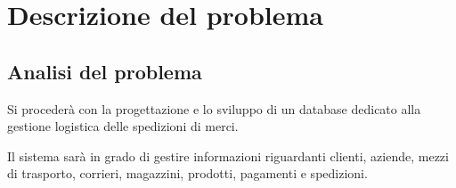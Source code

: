 \section{Descrizione del problema}

\subsection{Analisi del problema}

Si procederà con la progettazione e lo sviluppo di un database dedicato alla gestione logistica delle spedizioni di merci.

Il sistema sarà in grado di gestire informazioni riguardanti clienti, aziende, mezzi di trasporto, corrieri, magazzini, prodotti, pagamenti e spedizioni.